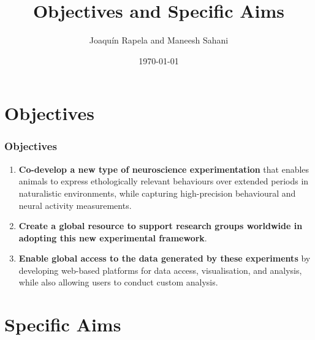 \documentclass{beamer}
\title{Objectives and Specific Aims}
\author[]{Joaqu\'{i}n Rapela and Maneesh Sahani}
\institute{Gatsby Computational Neuroscience Unit}
\date{\today}
\begin{document}
\frame{\titlepage}

\begin{comment}
\begin{frame}
    \frametitle{Contents}

    \tableofcontents

\end{frame}
\end{comment}


\section{Objectives}

\begin{frame}
    \frametitle{Objectives}

    \begin{enumerate}

        \item \textbf{Co-develop a new type of neuroscience experimentation}
            that enables animals to express ethologically relevant behaviours
            over extended periods in naturalistic environments, while capturing
            high-precision behavioural and neural activity measurements.


        \item \textbf{Create a global resource to support research groups worldwide
            in adopting this new experimental framework}.

        \item \textbf{Enable global access to the data generated by these
            experiments} by developing web-based platforms for data access,
            visualisation, and analysis, while also allowing users to conduct
            custom analysis.

    \end{enumerate}

\end{frame}

\section{Specific Aims}
\end{document}
